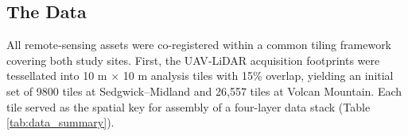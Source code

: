 \documentclass[remotesensing,article,accept,pdftex,moreauthors]{Definitions/mdpi}
\begin{document}
\subsection{The Data}

All remote‐sensing assets were co-registered within a common tiling framework covering both study sites.   First, the UAV‐LiDAR acquisition footprints were tessellated into 10 m × 10 m analysis tiles with 15\% overlap, yielding an initial set of 9800 tiles at Sedgwick–Midland and 26,557 tiles at Volcan Mountain. Each tile served as the spatial key for assembly of a four-layer data stack (Table \ref{tab:data_summary}).

\end{document}
